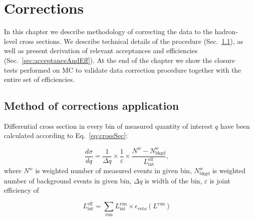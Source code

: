 

\chapter{Corrections}\label{chap:corrections}

In this chapter we describe methodology of correcting the data to the hadron-level cross sections. We describe technical details of the procedure (Sec.~\ref{sec:correctionProcedure}), as well as present derivation of relevant acceptances and efficiencies (Sec.~\ref{sec:acceptanceAndEff}). At the end of the chapter we show the closure tests performed on MC to validate data correction procedure together with the entire set of efficiencies.


\section{Method of corrections application}\label{sec:correctionProcedure}

Differential cross section in every bin of measured quantity of interest $q$ have been calculated according to Eq.~\eqref{eq:crossSec}:

\begin{equation}\label{eq:crossSec} 
  \frac{d\sigma}{dq} = \frac{1}{\Delta q} \times \frac{1}{\varepsilon} \times \frac{N^{\mathit{w}}-N^{\mathit{w}}_\textrm{bkgd}}{\mathit{L}_{\textrm{int}}^{\textrm{eff}}},
\end{equation}%
%
where $N^{w}$ is weighted number of measured events in given bin, $N^{w}_{\text{bkgd}}$ is weighted number of background events in given bin, $\Delta q$ is width of the bin, $\varepsilon$ is joint efficiency of 

\begin{equation}\label{eq:effectiveLumi}
	\mathit{L}_{\textrm{int}}^{\textrm{eff}} = \sum\limits_{\textrm{run}}\mathit{L}_{\textrm{int}}^{\textrm{run}} \times \epsilon_{\textrm{veto}}(L^{\textrm{run}})
\end{equation}

